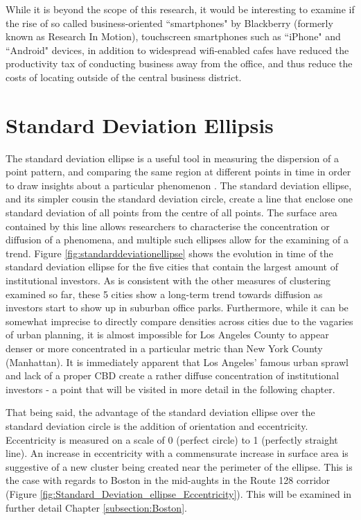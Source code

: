 While it is beyond the scope of this research, it would be interesting to examine if the rise of so called business-oriented ``smartphones" by Blackberry (formerly known as Research In Motion), touchscreen smartphones such as ``iPhone" and ``Android" devices, in addition to widespread wifi-enabled cafes have reduced the productivity tax of conducting business away from the office, and thus reduce the costs of locating outside of the central business district.   








\section{Standard Deviation Ellipsis}

The standard deviation ellipse is a useful tool in measuring the dispersion of a point pattern, and comparing the same region at different points in time in order to draw insights about a particular phenomenon \citep{Yuill1971}. The standard deviation ellipse, and its simpler cousin the standard deviation circle, create a line that enclose one standard deviation of all points from the centre of all points.  The surface area contained by this line allows researchers to characterise the concentration or diffusion of a phenomena, and multiple such ellipses allow for the examining of a trend.  Figure \ref{fig:standarddeviationellipse} shows the evolution in time of the standard deviation ellipse for the five cities that contain the largest amount of institutional investors. As is consistent with the other measures of clustering examined so far, these 5 cities show a long-term trend towards diffusion as investors start to show up in suburban office parks. Furthermore, while it can be somewhat imprecise to directly compare densities across cities due to the vagaries of urban planning, it is almost impossible for Los Angeles County to appear denser or more concentrated in a particular metric than New York County (Manhattan). It is immediately apparent that Los Angeles' famous urban sprawl and lack of a proper CBD create a rather diffuse concentration of institutional investors - a point that will be visited in more detail in the following chapter.  

That being said, the advantage of the standard deviation ellipse over the standard deviation circle is the addition of orientation and eccentricity. Eccentricity is measured on a scale of 0 (perfect circle) to 1 (perfectly straight line).  An increase in eccentricity with a commensurate increase in surface area is suggestive of a new cluster being created near the perimeter of the ellipse. This is the case with regards to Boston in the mid-aughts in the Route 128 corridor (Figure \ref{fig:Standard_Deviation_ellipse_Eccentricity}). This will be examined in further detail Chapter \ref{subsection:Boston}.     

